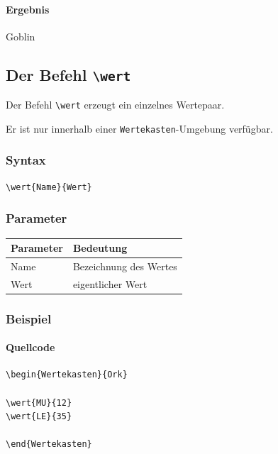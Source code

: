 \paragraph{Ergebnis}

\begin{Wertekasten}{Goblin}


\end{Wertekasten}


\subsection{Der Befehl \texttt{\textbackslash wert}}

Der Befehl \verb|\wert| erzeugt ein einzelnes Wertepaar.

Er ist nur innerhalb einer \verb|Wertekasten|-Umgebung verfügbar.

\subsubsection*{Syntax}

\begin{Verbatim}
\wert{Name}{Wert}
\end{Verbatim}

\subsubsection*{Parameter}

\begin{center}
\begin{tabular}{|l|l|}
\hline
Parameter & Bedeutung\\
\hline
Name & Bezeichnung des Wertes\\
\hline
Wert & eigentlicher Wert\\
\hline
\end{tabular}
\end{center}

\subsubsection*{Beispiel}

\paragraph{Quellcode}

\begin{Verbatim}
\begin{Wertekasten}{Ork}

\wert{MU}{12}
\wert{LE}{35}

\end{Wertekasten}
\end{Verbatim}

